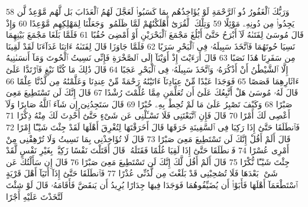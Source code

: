{\tiny\colorbox{cl_aya}{58}} وَرَبُّكَ ٱلْغَفُورُ ذُو ٱلرَّحْمَةِ لَوْ يُؤَاخِذُهُم بِمَا كَسَبُوا۟ لَعَجَّلَ لَهُمُ ٱلْعَذَابَ بَل لَّهُم مَّوْعِدٌ لَّن يَجِدُوا۟ مِن دُونِهِۦ مَوْئِلًا
{\tiny\colorbox{cl_aya}{59}} وَتِلْكَ ٱلْقُرَىٰٓ أَهْلَكْنَٰهُمْ لَمَّا ظَلَمُوا۟ وَجَعَلْنَا لِمَهْلِكِهِم مَّوْعِدًا
{\tiny\colorbox{cl_aya}{60}} وَإِذْ قَالَ مُوسَىٰ لِفَتَىٰهُ لَآ أَبْرَحُ حَتَّىٰٓ أَبْلُغَ مَجْمَعَ ٱلْبَحْرَيْنِ أَوْ أَمْضِىَ حُقُبًا
{\tiny\colorbox{cl_aya}{61}} فَلَمَّا بَلَغَا مَجْمَعَ بَيْنِهِمَا نَسِيَا حُوتَهُمَا فَٱتَّخَذَ سَبِيلَهُۥ فِى ٱلْبَحْرِ سَرَبًا
{\tiny\colorbox{cl_aya}{62}} فَلَمَّا جَاوَزَا قَالَ لِفَتَىٰهُ ءَاتِنَا غَدَآءَنَا لَقَدْ لَقِينَا مِن سَفَرِنَا هَٰذَا نَصَبًا
{\tiny\colorbox{cl_aya}{63}} قَالَ أَرَءَيْتَ إِذْ أَوَيْنَآ إِلَى ٱلصَّخْرَةِ فَإِنِّى نَسِيتُ ٱلْحُوتَ وَمَآ أَنسَىٰنِيهُ إِلَّا ٱلشَّيْطَٰنُ أَنْ أَذْكُرَهُۥ وَٱتَّخَذَ سَبِيلَهُۥ فِى ٱلْبَحْرِ عَجَبًا
{\tiny\colorbox{cl_aya}{64}} قَالَ ذَٰلِكَ مَا كُنَّا نَبْغِ فَٱرْتَدَّا عَلَىٰٓ ءَاثَارِهِمَا قَصَصًا
{\tiny\colorbox{cl_aya}{65}} فَوَجَدَا عَبْدًا مِّنْ عِبَادِنَآ ءَاتَيْنَٰهُ رَحْمَةً مِّنْ عِندِنَا وَعَلَّمْنَٰهُ مِن لَّدُنَّا عِلْمًا
{\tiny\colorbox{cl_aya}{66}} قَالَ لَهُۥ مُوسَىٰ هَلْ أَتَّبِعُكَ عَلَىٰٓ أَن تُعَلِّمَنِ مِمَّا عُلِّمْتَ رُشْدًا
{\tiny\colorbox{cl_aya}{67}} قَالَ إِنَّكَ لَن تَسْتَطِيعَ مَعِىَ صَبْرًا
{\tiny\colorbox{cl_aya}{68}} وَكَيْفَ تَصْبِرُ عَلَىٰ مَا لَمْ تُحِطْ بِهِۦ خُبْرًا
{\tiny\colorbox{cl_aya}{69}} قَالَ سَتَجِدُنِىٓ إِن شَآءَ ٱللَّهُ صَابِرًا وَلَآ أَعْصِى لَكَ أَمْرًا
{\tiny\colorbox{cl_aya}{70}} قَالَ فَإِنِ ٱتَّبَعْتَنِى فَلَا تَسْـَٔلْنِى عَن شَىْءٍ حَتَّىٰٓ أُحْدِثَ لَكَ مِنْهُ ذِكْرًا
{\tiny\colorbox{cl_aya}{71}} فَٱنطَلَقَا حَتَّىٰٓ إِذَا رَكِبَا فِى ٱلسَّفِينَةِ خَرَقَهَا قَالَ أَخَرَقْتَهَا لِتُغْرِقَ أَهْلَهَا لَقَدْ جِئْتَ شَيْـًٔا إِمْرًا
{\tiny\colorbox{cl_aya}{72}} قَالَ أَلَمْ أَقُلْ إِنَّكَ لَن تَسْتَطِيعَ مَعِىَ صَبْرًا
{\tiny\colorbox{cl_aya}{73}} قَالَ لَا تُؤَاخِذْنِى بِمَا نَسِيتُ وَلَا تُرْهِقْنِى مِنْ أَمْرِى عُسْرًا
{\tiny\colorbox{cl_aya}{74}} فَٱنطَلَقَا حَتَّىٰٓ إِذَا لَقِيَا غُلَٰمًا فَقَتَلَهُۥ قَالَ أَقَتَلْتَ نَفْسًا زَكِيَّةًۢ بِغَيْرِ نَفْسٍ لَّقَدْ جِئْتَ شَيْـًٔا نُّكْرًا
{\tiny\colorbox{cl_aya}{75}} قَالَ أَلَمْ أَقُل لَّكَ إِنَّكَ لَن تَسْتَطِيعَ مَعِىَ صَبْرًا
{\tiny\colorbox{cl_aya}{76}} قَالَ إِن سَأَلْتُكَ عَن شَىْءٍۭ بَعْدَهَا فَلَا تُصَٰحِبْنِى قَدْ بَلَغْتَ مِن لَّدُنِّى عُذْرًا
{\tiny\colorbox{cl_aya}{77}} فَٱنطَلَقَا حَتَّىٰٓ إِذَآ أَتَيَآ أَهْلَ قَرْيَةٍ ٱسْتَطْعَمَآ أَهْلَهَا فَأَبَوْا۟ أَن يُضَيِّفُوهُمَا فَوَجَدَا فِيهَا جِدَارًا يُرِيدُ أَن يَنقَضَّ فَأَقَامَهُۥ قَالَ لَوْ شِئْتَ لَتَّخَذْتَ عَلَيْهِ أَجْرًا
